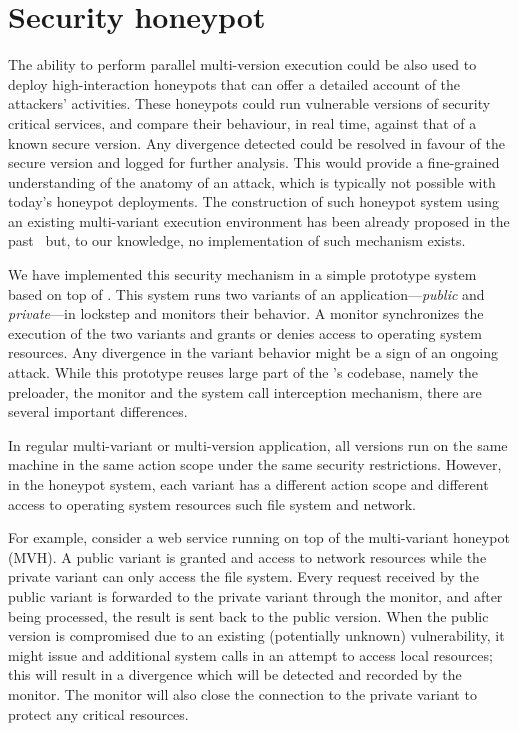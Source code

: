 \section{Security honeypot}
\label{sec:honeypot}

The ability to perform parallel multi-version execution could be also used to
deploy high-interaction honeypots that can offer a detailed account of the
attackers' activities. These honeypots could run vulnerable versions of
security critical services, and compare their behaviour, in real time, against
that of a known secure version.  Any divergence detected could be resolved in
favour of the secure version and logged for further analysis.  This would
provide a fine-grained understanding of the anatomy of an attack, which is
typically not possible with today's honeypot deployments. The construction
of such honeypot system using an existing multi-variant execution environment
has been already proposed in the past~\cite{jackson10} but, to our knowledge,
no implementation of such mechanism exists.

We have implemented this security mechanism in a simple prototype system based
on top of \varan. This system runs two variants of an
application---\emph{public} and \emph{private}---in lockstep and monitors their
behavior. A monitor synchronizes the execution of the two variants and grants
or denies access to operating system resources. Any divergence in the variant
behavior might be a sign of an ongoing attack. While this prototype reuses
large part of the \varan's codebase, namely the preloader, the monitor and the
system call interception mechanism, there are several important differences.

In regular multi-variant or multi-version application, all versions run on the
same machine in the same action scope under the same security restrictions.
However, in the honeypot system, each variant has a different action scope and
different access to operating system resources such file system and network.

For example, consider a web service running on top of the multi-variant
honeypot (MVH). A public variant is granted and access to network resources
while the private variant can only access the file system. Every request
received by the public variant is forwarded to the private variant through the
monitor, and after being processed, the result is sent back to the public
version. When the public version is compromised due to an existing (potentially
unknown) vulnerability, it might issue and additional system calls in an
attempt to access local resources; this will result in a divergence which will
be detected and recorded by the monitor. The monitor will also close the
connection to the private variant to protect any critical resources.

